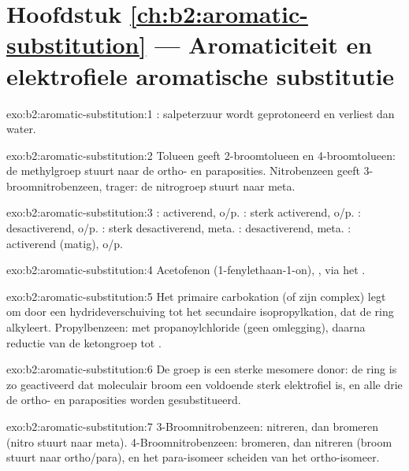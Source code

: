\section*{Hoofdstuk \ref{ch:b2:aromatic-substitution} --- Aromaticiteit en elektrofiele aromatische substitutie}

\begin{solution}{exo:b2:aromatic-substitution:1}
: salpeterzuur wordt geprotoneerd en verliest dan water.
\end{solution}

\begin{solution}{exo:b2:aromatic-substitution:2}
Tolueen geeft 2-broomtolueen en 4-broomtolueen: de methylgroep stuurt naar de ortho- en
paraposities. Nitrobenzeen geeft 3-broomnitrobenzeen, trager: de nitrogroep
stuurt naar meta.
\end{solution}

\begin{solution}{exo:b2:aromatic-substitution:3}
: activerend, o/p. : sterk activerend, o/p. : desactiverend, o/p.
: sterk desactiverend, meta. : desactiverend, meta. :
activerend (matig), o/p.
\end{solution}

\begin{solution}{exo:b2:aromatic-substitution:4}
Acetofenon (1-fenylethaan-1-on), , via het  .
\end{solution}

\begin{solution}{exo:b2:aromatic-substitution:5}
Het primaire carbokation (of zijn complex) legt om door een hydrideverschuiving tot het secundaire
isopropylkation, dat de ring alkyleert. Propylbenzeen:  met
propanoylchloride (geen omlegging), daarna reductie van de ketongroep  tot .
\end{solution}

\begin{solution}{exo:b2:aromatic-substitution:6}
De groep  is een sterke mesomere donor: de ring is zo geactiveerd dat moleculair broom
een voldoende sterk elektrofiel is, en alle drie de ortho- en paraposities worden gesubstitueerd.
\end{solution}

\begin{solution}{exo:b2:aromatic-substitution:7}
3-Broomnitrobenzeen: nitreren, dan bromeren (nitro stuurt naar meta). 4-Broomnitrobenzeen:
bromeren, dan nitreren (broom stuurt naar ortho/para), en het para-isomeer scheiden van het
ortho-isomeer.
\end{solution}

